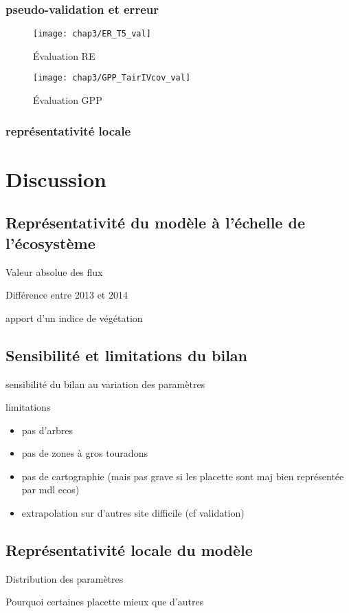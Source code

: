 \subsubsection{pseudo-validation et erreur}

\begin{figure}
\centering
\texttt{[image: chap3/ER\_T5\_val]}
\caption{Évaluation RE}
\label{fig:RE_T5_val}
\end{figure}
\begin{figure}
\centering
\texttt{[image: chap3/GPP\_TairIVcov\_val]}
\caption{Évaluation GPP}
\label{fig:GPP_TairIVcov_val}
\end{figure}

\subsubsection{représentativité locale}


\section{Discussion}

\subsection{Représentativité du modèle à l'échelle de l'écosystème}

Valeur absolue des flux

Différence entre 2013 et 2014

apport d'un indice de végétation

\subsection{Sensibilité et limitations du bilan}

sensibilité du bilan au variation des paramètres

limitations

\begin{itemize}
\item pas d'arbres
\item pas de zones à gros touradons
\item pas de cartographie (mais pas grave si les placette sont maj bien représentée par mdl ecos)
\item extrapolation sur d'autres site difficile (cf validation)
\end{itemize}

\subsection{Représentativité locale du modèle}

Distribution des paramètres

Pourquoi certaines placette mieux que d'autres





